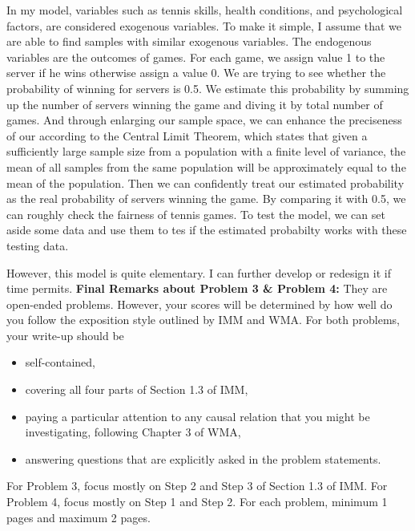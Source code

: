 \documentclass[12pt]{article}
\begin{document}
In my model, variables such as tennis skills, health conditions, and psychological factors, are considered exogenous variables. To make it simple, I assume that we are able to find samples with similar exogenous variables. The endogenous variables are the outcomes of games. For each game, we assign value 1 to the server if he wins otherwise assign a value 0. We are trying to see whether the probability of winning for servers is 0.5. We estimate this probability by summing up the number of servers winning the game and diving it by total number of games. And through enlarging our sample space, we can enhance the preciseness of our according to the Central Limit Theorem, which states that given a sufficiently large sample size from a population with a finite level of variance, the mean of all samples from the same population will be approximately equal to the mean of the population. Then we can confidently treat our estimated probability as the real probability of servers winning the game. By comparing it with 0.5, we can roughly check the fairness of tennis games. To test the model, we can set aside some data and use them to tes if the estimated probabilty works with these testing data.

However, this model is quite elementary. I can further develop or redesign it if time permits.
\vskip0.25in
\noindent\textbf{Final Remarks about Problem 3 \& Problem 4:} 
They are open-ended problems.  However, your scores will be determined
by how well do you follow the exposition style outlined by IMM and
WMA.  For both problems, your write-up should be 
\begin{itemize}
\item self-contained,
\item covering all four parts of Section 1.3 of IMM,
\item paying a particular attention to any causal relation that you
  might be investigating, following Chapter 3 of WMA,
\item answering questions that are explicitly asked in the problem statements.
\end{itemize}
For Problem 3, focus mostly on Step 2 and Step 3 of Section
1.3 of IMM.  For Problem 4, focus mostly on Step 1 and Step
2.  For each problem, minimum 1 pages and maximum 2 pages.
\end{document}
